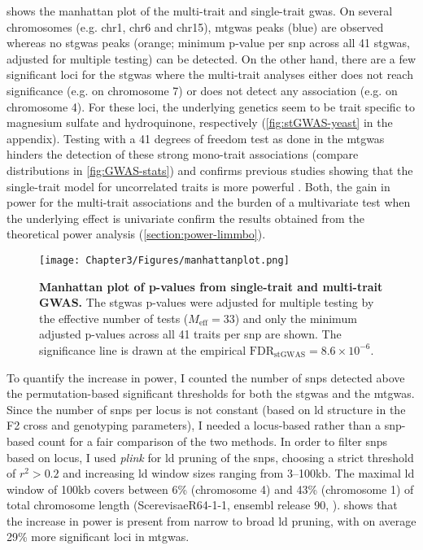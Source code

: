  shows the manhattan plot of the multi-trait and single-trait \gls{gwas}. On several chromosomes (e.g. chr1, chr6 and chr15), \gls{mtgwas} peaks (blue) are observed whereas no \gls{stgwas} peaks (orange; minimum p-value per \gls{snp} across all \num{41} \gls{stgwas}, adjusted for multiple testing) can be detected. On the other hand, there are a few significant loci for the \gls{stgwas} where the multi-trait analyses either does not reach significance (e.g. on chromosome \num{7}) or does not detect any association (e.g. on chromosome \num{4}). For these loci, the underlying genetics seem to be trait specific to magnesium sulfate and hydroquinone, respectively (\cref{fig:stGWAS-yeast} in the appendix). Testing with a \num{41} degrees of freedom test as done in the \gls{mtgwas} hinders the detection of these strong mono-trait associations (compare distributions in \cref{fig:GWAS-stats}) and confirms previous studies showing that the single-trait model for uncorrelated traits is more powerful \citep{Korte2010}. Both, the gain in power for the multi-trait associations and the burden of a multivariate test when the underlying effect is univariate confirm the results obtained from the theoretical power analysis (\cref{section:power-limmbo}). 

\begin{figure}[hbtp]
	\centering
	\texttt{[image: Chapter3/Figures/manhattanplot.png]}
	\caption[\textbf{Manhattan plot of p-values from single-trait and multi-trait GWAS.}]{\textbf{Manhattan plot of p-values from single-trait and multi-trait GWAS.} The \gls{stgwas} p-values were adjusted for multiple testing by the effective number of tests (\(M_\text{eff} = 33\)) and only the minimum adjusted p-values across all \num{41} traits per \gls{snp} are shown. The significance line is drawn at the empirical \(\text{FDR}_{\text{stGWAS}} =8.6 \times 10^{-6}\).}
 	\label{fig:GWAS-yeast}
\end{figure}

To quantify the increase in power, I counted the number of \glspl{snp} detected above the permutation-based significant thresholds for both the \gls{stgwas} and the \gls{mtgwas}. Since the number of \glspl{snp} per locus is not constant (based on \gls{ld} structure in the F2 cross and genotyping parameters), I needed a locus-based rather than a \gls{snp}-based count for a fair comparison of the two methods. In order to filter \glspl{snp} based on locus, I used \textit{plink} for \gls{ld} pruning of the \glspl{snp}, choosing a strict threshold of \(r^2 > 0.2\) and increasing \gls{ld} window sizes ranging from \numrange{3}{100}kb.  The maximal \gls{ld} window of \num{100}kb covers between \num{6}\% (chromosome \num{4}) and \num{43}\% (chromosome 1) of total chromosome length (ScerevisaeR64-1-1, ensembl release 90, \citep{Aken2016}).  shows that the increase in power is present from narrow to broad \gls{ld} pruning, with on average \num{29}\% more significant loci in \gls{mtgwas}.

